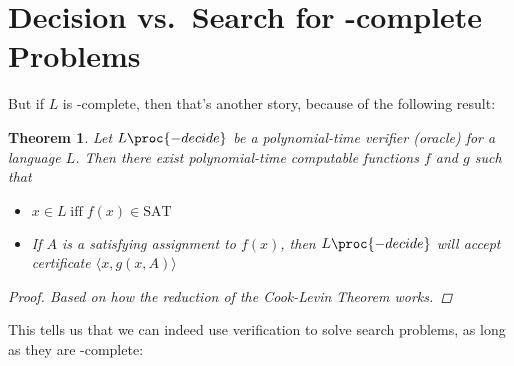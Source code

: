 \documentclass[a4paper]{report}
\newtheorem{theo}{Theorem}
\theoremstyle{definition}
\begin{document}
\section{Decision vs.~Search for \NP-complete Problems}
But if $L$ is \NP-complete, then that's another story, because of the following result:
\begin{theo}
Let $L\proc{-decide}$ be a polynomial-time verifier (oracle) for a language $L$. Then there exist polynomial-time computable functions $f$ and $g$ such that
\begin{itemize}
\item $x \in L \; \text{iff} \; f(x) \in \text{SAT}$
\item If $A$ is a satisfying assignment to $f(x)$, then $L\proc{-decide}$ will accept certificate $\langle x, g(x,A) \rangle$
\end{itemize}
\begin{proof}
Based on how the reduction of the Cook-Levin Theorem works.
\end{proof}
\end{theo}

This tells us that we can indeed use verification to solve search problems, as long as they are \NP-complete:
\end{document}

